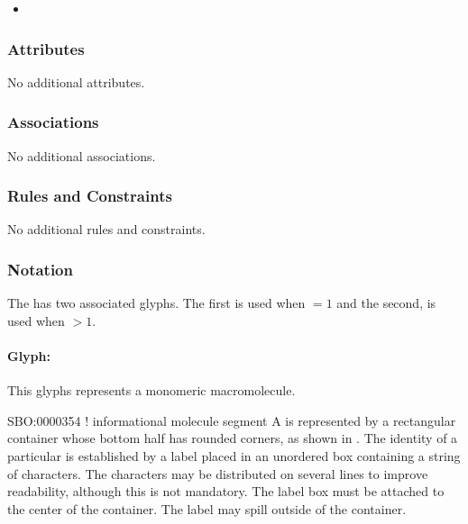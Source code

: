 \begin{itemize}
\item {}
\end{itemize}

\subsubsection{Attributes}

No additional attributes.

\subsubsection{Associations}

No additional associations.

\subsubsection{Rules and Constraints}

No additional rules and constraints.

\subsubsection{Notation}

The  has two associated glyphs. The
first  is used when
 $=1$ and the second,  is used when  $>1$.

\paragraph{Glyph: }

This glyphs represents a monomeric macromolecule.

\begin{glyphDescription}
\glyphSboTerm SBO:0000354 !  informational molecule segment
\glyphContainer A  is represented by a rectangular container whose bottom half has rounded corners, as shown in .
\glyphLabel The identity of a particular  is established by a label placed in an unordered box containing a string of characters.  The characters may be distributed on several lines to improve readability, although this is not mandatory.  The label box must be attached to the center of the container.  The label may spill outside of the container.
\end{glyphDescription}



